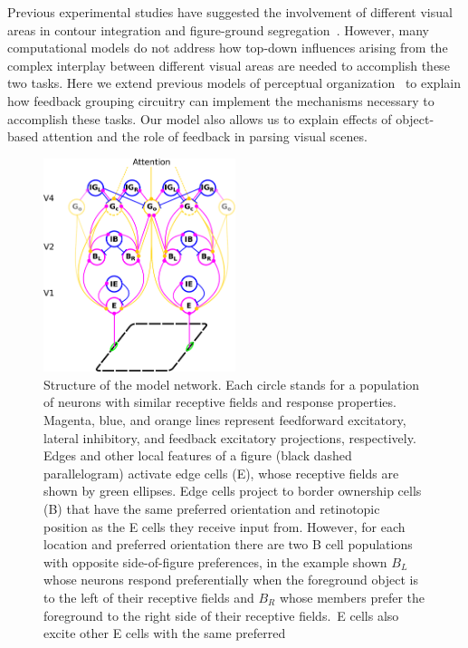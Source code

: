 Previous experimental studies have suggested the involvement of different visual areas in contour integration and figure-ground segregation~\citep{Poort_etal12,Chen_etal14}. However, many computational models do not address how top-down influences arising from the complex interplay between different visual areas are needed to accomplish these two tasks. Here we extend previous models of perceptual organization~\citep{Craft_etal07,Mihalas_etal11b} to explain how feedback grouping circuitry can implement the mechanisms necessary to accomplish these tasks. Our model also allows us to explain
effects of object-based attention and the role of feedback in parsing visual scenes.

\begin{figure}[t]
\centering
\includegraphics[width=0.5\textwidth]{Contour/figs/Fig1.eps}
\makeatletter
\let\@currsize\normalsize
\caption{Structure of the model network. Each circle stands for a
  population of neurons with similar receptive fields
  and response properties. 
  Magenta, 
  blue, and orange lines represent
  feedforward excitatory, lateral inhibitory, and feedback excitatory
  projections, respectively. Edges and other local features of a figure (black dashed
  parallelogram) activate edge cells (E), whose receptive fields are
  shown by green ellipses. Edge cells project to border ownership
  cells (B) that have the same preferred orientation and 
  retinotopic position as the E cells they receive input from. However, for
  each location and preferred orientation there are two B cell
  populations with opposite side-of-figure preferences, in the example
  shown $B_{L}$ whose neurons respond preferentially when the foreground object is to the left of their receptive fields and $B_{R}$ whose members prefer the foreground to the right side of their receptive fields.\
  E cells also excite other E cells with the same preferred
}
\end{figure}
